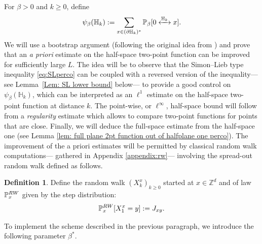 \documentclass[11pt,a4paper]{article}
\numberwithin{equation}{section}
\theoremstyle{plain}
\theoremstyle{definition}
\newtheorem{Def}[Thm]{Definition}
\newcommand{\connect}{\xleftrightarrow}
\begin{document}
For $\beta>0$ and $k\geq 0$, define
\begin{equation}
	\psi_\beta(\mathbb H_k):=\sum_{x\in (\partial \mathbb H_k)^*}\mathbb P_{\beta}[0\connect{\mathbb H_k\:}x].
\end{equation}
We will use a bootstrap argument (following the original idea from \cite{Slade1987Diffusion}) and prove that an \emph{a priori} estimate on the half-space two-point function can be improved for sufficiently large $L$.
The idea will be to observe that the Simon--Lieb type inequality \eqref{eq:SLperco} can be coupled with a reversed version of the inequality--- see Lemma~\ref{Lem: SL lower bound} below--- to provide a good control on $\psi_\beta(\mathbb H_k)$, which can be interpreted as an $\ell^1$ estimate on the half-space two-point function at distance $k$. The point-wise, or $\ell^\infty$, half-space bound will follow from a \emph{regularity} estimate which allows to compare two-point functions for points that are close. Finally, we will deduce the full-space estimate from the half-space one (see Lemma \ref{lem: full plane 2pt function out of halfplane one perco}). The improvement of the a priori estimates will be permitted by classical random walk computations--- gathered in Appendix \ref{appendix:rw}--- involving the spread-out random walk defined as follows.
\begin{Def}\label{def: the random walk}\label{def: random walk J}
Define the random walk $(X_k^x)_{k\geq 0}$ started at $x\in \mathbb Z^d$ and of law $\mathbb P^{\rm RW}_{x}$ given by the step distribution:
\begin{equation}\label{eq:def random walk J}
	\mathbb P^{\rm RW}_{x}[X_1^x=y]:=J_{xy}.
\end{equation}
\end{Def}


To implement the scheme described in the previous paragraph, we introduce the following parameter $\beta^*$.
\end{document}

